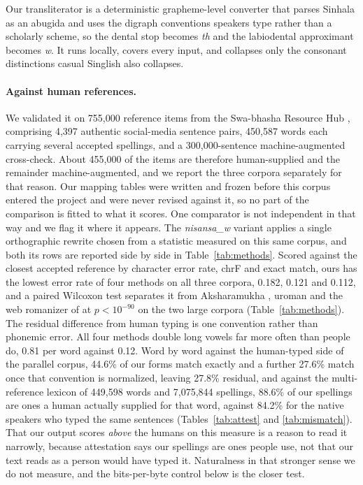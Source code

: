 \documentclass{article}
\newcommand{\rom}[1]{\textit{#1}}
\begin{document}
Our transliterator is a deterministic grapheme-level converter that parses Sinhala as
an abugida and uses the digraph conventions speakers type rather than a scholarly
scheme, so the dental stop becomes \rom{th} and the labiodental approximant becomes
\rom{w}. It runs locally, covers every input, and collapses only the consonant
distinctions casual Singlish also collapses.

\paragraph{Against human references.} We validated it on 755{,}000 reference
items from the Swa-bhasha Resource Hub \citep{sumanathilaka-etal-2025-swabhasha}, comprising
4{,}397 authentic social-media sentence pairs, 450{,}587 words each carrying several
accepted spellings, and a 300{,}000-sentence machine-augmented cross-check. About
455{,}000 of the items are therefore human-supplied and the remainder machine-augmented,
and we report the three corpora separately for that reason. Our mapping tables were
written and frozen before this corpus entered the project and were never revised against
it, so no part of the comparison is fitted to what it scores. One comparator is not
independent in that way and we flag it where it appears. The \rom{nisansa\_w} variant
applies a single orthographic rewrite chosen from a statistic measured on this same
corpus, and both its rows are reported side by side in Table~\ref{tab:methods}. Scored
against the closest accepted reference by character error rate, chrF
\citep{popovic-2015-chrf} and exact match, ours has the lowest error rate of four
methods on all three corpora, 0.182, 0.121 and 0.112, and a paired Wilcoxon test
separates it from Aksharamukha \citep{rajan-aksharamukha}, uroman
\citep{hermjakob-etal-2018-uroman} and the web romanizer of
\citet{desilva-ranathunga-2026-sinhalapiqa} at $p < 10^{-90}$ on the two large
corpora (Table~\ref{tab:methods}). The residual difference from human typing is one
convention rather than phonemic error. All four methods double long vowels far more
often than people do, 0.81 per word against 0.12. Word by word against the
human-typed side of the parallel corpus, 44.6\% of our forms match exactly and a
further 27.6\% match once that convention is normalized, leaving 27.8\% residual, and
against the multi-reference lexicon of 449{,}598 words and 7{,}075{,}844 spellings,
88.6\% of our spellings are ones a human actually supplied for that word, against
84.2\% for the native speakers who typed the same sentences
(Tables~\ref{tab:attest} and \ref{tab:mismatch}). That our output scores \emph{above}
the humans on this measure is a reason to read it narrowly, because attestation says our
spellings are ones people use, not that our text reads as a person would have typed it.
Naturalness in that stronger sense we do not measure, and the bits-per-byte control
below is the closer test.
\end{document}
